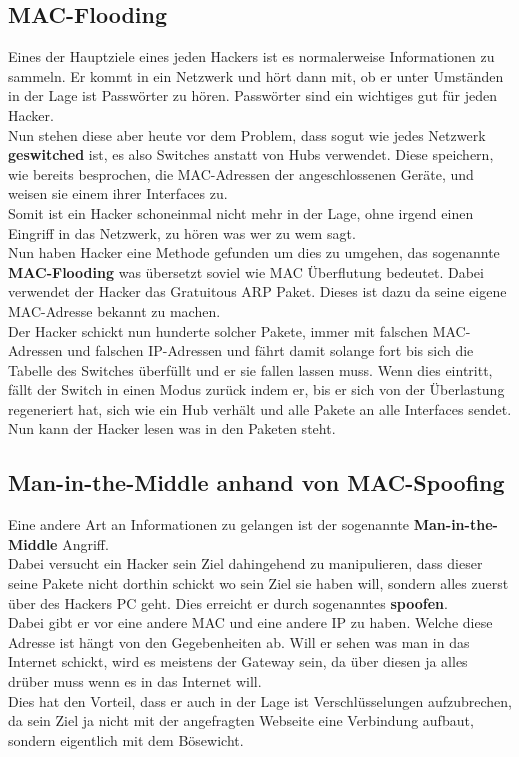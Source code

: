 \documentclass[12pt,a4paper]{report}
\begin{document}
\subsection{MAC-Flooding}\label{ssec:mflood}
Eines der Hauptziele eines jeden Hackers ist es normalerweise Informationen zu sammeln. Er kommt in ein Netzwerk und hört dann mit, ob er unter Umständen in der Lage ist Passwörter zu hören. Passwörter sind ein wichtiges gut für jeden Hacker.\\
Nun stehen diese aber heute vor dem Problem, dass sogut wie jedes Netzwerk \textbf{geswitched} ist, es also Switches anstatt von Hubs verwendet. Diese speichern, wie bereits besprochen, die MAC-Adressen der angeschlossenen Geräte, und weisen sie einem ihrer Interfaces zu.\\
Somit ist ein Hacker schoneinmal nicht mehr in der Lage, ohne irgend einen Eingriff in das Netzwerk, zu hören was wer zu wem sagt.\\

Nun haben Hacker eine Methode gefunden um dies zu umgehen, das sogenannte \textbf{MAC-Flooding} was übersetzt soviel wie MAC Überflutung bedeutet. Dabei verwendet der Hacker das Gratuitous ARP Paket. Dieses ist dazu da seine eigene MAC-Adresse bekannt zu machen.\\
Der Hacker schickt nun hunderte solcher Pakete, immer mit falschen MAC-Adressen und falschen IP-Adressen und fährt damit solange fort bis sich die Tabelle des Switches überfüllt und er sie fallen lassen muss. Wenn dies eintritt, fällt der Switch in einen Modus zurück indem er, bis er sich von der Überlastung regeneriert hat, sich wie ein Hub verhält und alle Pakete an alle Interfaces sendet. Nun kann der Hacker lesen was in den Paketen steht.\\

\subsection{Man-in-the-Middle anhand von MAC-Spoofing}\label{ssec:mspoof}
Eine andere Art an Informationen zu gelangen ist der sogenannte \textbf{Man-in-the-Middle} Angriff.\\
Dabei versucht ein Hacker sein Ziel dahingehend zu manipulieren, dass dieser seine Pakete nicht dorthin schickt wo sein Ziel sie haben will, sondern alles zuerst über des Hackers PC geht. Dies erreicht er durch sogenanntes \textbf{spoofen}.\\

Dabei gibt er vor eine andere MAC und eine andere IP zu haben. Welche diese Adresse ist hängt von den Gegebenheiten ab. Will er sehen was man in das Internet schickt, wird es meistens der Gateway sein, da über diesen ja alles drüber muss wenn es in das Internet will.\\
Dies hat den Vorteil, dass er auch in der Lage ist Verschlüsselungen aufzubrechen, da sein Ziel ja nicht mit der angefragten Webseite eine Verbindung aufbaut, sondern eigentlich mit dem Bösewicht. 
\end{document}
